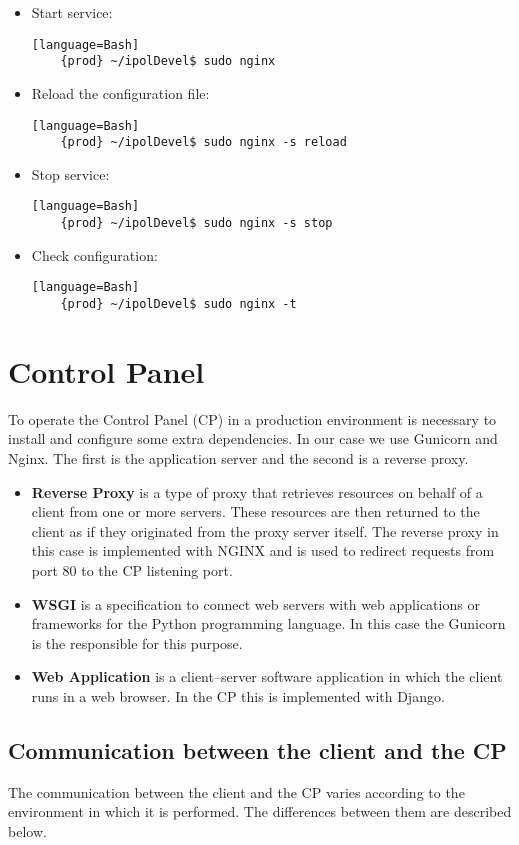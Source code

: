 \documentclass[a4paper,12pt]{article}
\begin{document}
\begin{itemize}
    \item Start service:
    \begin{verbatim}[language=Bash]
    {prod} ~/ipolDevel$ sudo nginx
    \end{verbatim}
    \item Reload the configuration file:
    \begin{verbatim}[language=Bash]
    {prod} ~/ipolDevel$ sudo nginx -s reload
    \end{verbatim}
    \item Stop service:
    \begin{verbatim}[language=Bash]
    {prod} ~/ipolDevel$ sudo nginx -s stop
    \end{verbatim}
    \item Check configuration:
    \begin{verbatim}[language=Bash]
    {prod} ~/ipolDevel$ sudo nginx -t
    \end{verbatim}
\end{itemize}


\section{Control Panel}
To operate the Control Panel (CP) in a production environment is necessary to install and configure some extra dependencies. In our case we use Gunicorn and Nginx. The first is the application server and the second is a reverse proxy.

\begin{itemize}
    \item \textbf{Reverse Proxy} is a type of proxy that retrieves resources on behalf of a client from one or more servers.
    These resources are then returned to the client as if they originated from the proxy server itself. The reverse proxy in this case is
    implemented with NGINX and is used to redirect requests from port 80 to the CP listening port.
    \item \textbf{WSGI} is a specification to connect web servers with web applications or frameworks for the Python programming language.
    In this case the Gunicorn is the responsible for this purpose.
    \item \textbf{Web Application} is a client–server software application in which the client runs in a web browser. In the CP this
    is implemented with Django.
\end{itemize}

\subsection{Communication between the client and the CP}
The communication between the client and the CP varies according to the environment in which it is performed.
The differences between them are described below.
\end{document}

